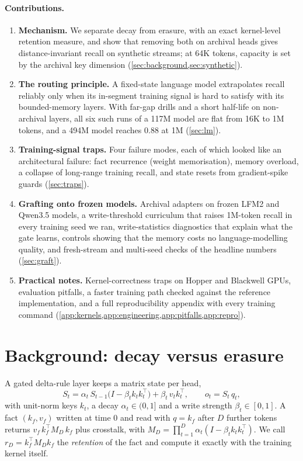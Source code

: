 \documentclass[11pt]{article}
\begin{document}
\paragraph{Contributions.}
\begin{enumerate}
\item \textbf{Mechanism.} We separate decay from erasure, with an exact kernel-level retention measure, and show that removing both on archival heads gives distance-invariant recall on synthetic streams; at 64K tokens, capacity is set by the archival key dimension (\cref{sec:background,sec:synthetic}).
\item \textbf{The routing principle.} A fixed-state language model extrapolates recall reliably only when its in-segment training signal is hard to satisfy with its bounded-memory layers. With far-gap drills and a short half-life on non-archival layers, all six such runs of a 117M model are flat from 16K to 1M tokens, and a 494M model reaches 0.88 at 1M (\cref{sec:lm}).
\item \textbf{Training-signal traps.} Four failure modes, each of which looked like an architectural failure: fact recurrence (weight memorisation), memory overload, a collapse of long-range training recall, and state resets from gradient-spike guards (\cref{sec:traps}).
\item \textbf{Grafting onto frozen models.} Archival adapters on frozen LFM2 \citep{lfm2} and Qwen3.5 \citep{qwen35} models, a write-threshold curriculum that raises 1M-token recall in every training seed we ran, write-statistics diagnostics that explain what the gate learns, controls showing that the memory costs no language-modelling quality, and fresh-stream and multi-seed checks of the headline numbers (\cref{sec:graft}).
\item \textbf{Practical notes.} Kernel-correctness traps on Hopper and Blackwell GPUs, evaluation pitfalls, a faster training path checked against the reference implementation, and a full reproducibility appendix with every training command (\cref{app:kernels,app:engineering,app:pitfalls,app:repro}).
\end{enumerate}

\section{Background: decay versus erasure}
\label{sec:background}
A gated delta-rule layer \citep{schlag2021,deltanet2024,gdn2024} keeps a matrix state per head,
\begin{equation}
S_t = \alpha_t\, S_{t-1}\bigl(I - \beta_t k_t k_t^{\top}\bigr) + \beta_t\, v_t k_t^{\top}, \qquad o_t = S_t\, q_t ,
\end{equation}
with unit-norm keys $k_t$, a decay $\alpha_t\in(0,1]$ and a write strength $\beta_t\in[0,1]$. A fact $(k_f, v_f)$ written at time $0$ and read with $q = k_f$ after $D$ further tokens returns $v_f\, k_f^{\top} M_D\, k_f$ plus crosstalk, with $M_D = \prod_{t=1}^{D} \alpha_t (I - \beta_t k_t k_t^{\top})$. We call $r_D = k_f^{\top} M_D k_f$ the \emph{retention} of the fact and compute it exactly with the training kernel itself.
\end{document}
